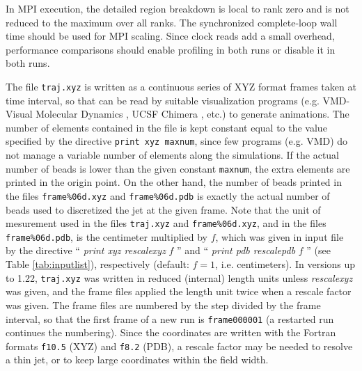In MPI execution, the detailed region breakdown is local to rank zero and is
not reduced to the maximum over all ranks. The synchronized complete-loop
wall time should be used for MPI scaling. Since clock reads add a small
overhead, performance comparisons should enable profiling in both runs or
disable it in both runs.

The file \texttt{traj.xyz} is written as a continuous series of XYZ
format frames taken at time interval, so that can be read by suitable
visualization programs (e.g. VMD-Visual Molecular Dynamics \cite{humphrey1996vmd},
UCSF Chimera \cite{pettersen2004ucsf}, etc.) to generate animations.
The number of elements contained in the file is kept constant equal
to the value specified by the directive \texttt{print xyz maxnum},
since few programs (e.g. VMD) do not manage a variable number of elements
along the simulations. If the actual number of beads is lower than
the given constant \texttt{maxnum}, the extra elements are printed
in the origin point. On the other hand, the number of beads printed
in the files \texttt{frame\%06d.xyz} and \texttt{frame\%06d.pdb} is
exactly the actual number of beads used to discretized the jet at
the given frame. Note that the unit of mesurement used in the files
\texttt{traj.xyz} and \texttt{frame\%06d.xyz}, and in the files
\texttt{frame\%06d.pdb}, is the centimeter multiplied by $f$, which was given in input file
by the directive `` \textit{print xyz rescalexyz} $f$ '' and `` \textit{print
pdb rescalepdb} $f$ '' (see Table \ref{tab:inputlist}), respectively
(default: $f=1$, i.e. centimeters). In versions up to 1.22,
\texttt{traj.xyz} was written in reduced (internal) length units unless
\textit{rescalexyz} was given, and the frame files applied the length
unit twice when a rescale factor was given. The frame files are numbered
by the step divided by the frame interval, so that the first frame of a
new run is \texttt{frame000001} (a restarted run continues the
numbering). Since the coordinates are written with the
Fortran formats \texttt{f10.5} (XYZ) and \texttt{f8.2} (PDB), a rescale
factor may be needed to resolve a thin jet, or to keep large coordinates
within the field width.

